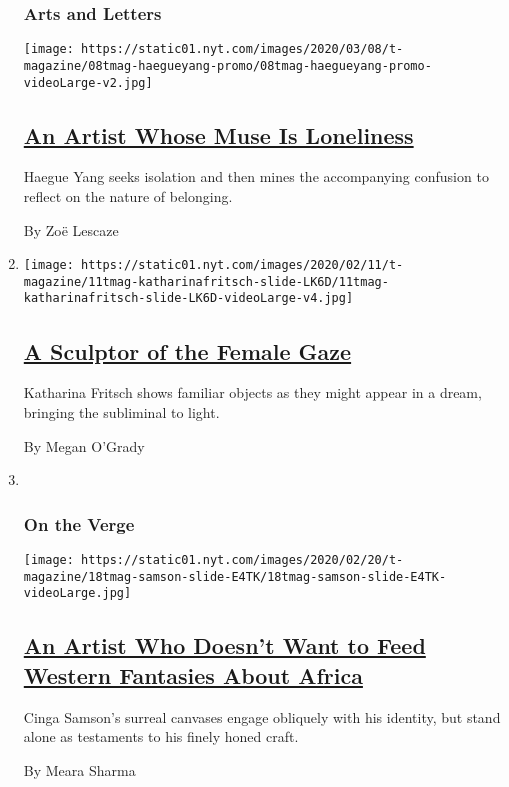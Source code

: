 \begin{enumerate}
{  \subsubsection{Arts and Letters}\label{arts-and-letters}}

  \texttt{[image: https://static01.nyt.com/images/2020/03/08/t-magazine/08tmag-haegueyang-promo/08tmag-haegueyang-promo-videoLarge-v2.jpg]}

  \hypertarget{an-artist-whose-muse-is-loneliness}{%
  \subsection{\texorpdfstring{\href{/2020/02/26/t-magazine/haegue-yang.html}{An
  Artist Whose Muse Is
  Loneliness}}{An Artist Whose Muse Is Loneliness}}\label{an-artist-whose-muse-is-loneliness}}

  Haegue Yang seeks isolation and then mines the accompanying confusion
  to reflect on the nature of belonging.

  By Zoë Lescaze
\item
  \texttt{[image: https://static01.nyt.com/images/2020/02/11/t-magazine/11tmag-katharinafritsch-slide-LK6D/11tmag-katharinafritsch-slide-LK6D-videoLarge-v4.jpg]}

  \hypertarget{a-sculptor-of-the-female-gaze}{%
  \subsection{\texorpdfstring{\href{/2020/02/12/t-magazine/katharina-fritsch-artist.html}{A
  Sculptor of the Female
  Gaze}}{A Sculptor of the Female Gaze}}\label{a-sculptor-of-the-female-gaze}}

  Katharina Fritsch shows familiar objects as they might appear in a
  dream, bringing the subliminal to light.

  By Megan O'Grady
\item ~
  \hypertarget{on-the-verge}{%
  \subsubsection{On the Verge}\label{on-the-verge}}

  \texttt{[image: https://static01.nyt.com/images/2020/02/20/t-magazine/18tmag-samson-slide-E4TK/18tmag-samson-slide-E4TK-videoLarge.jpg]}

  \hypertarget{an-artist-who-doesnt-want-to-feed-western-fantasies-about-africa}{%
  \subsection{\texorpdfstring{\href{/2020/02/21/t-magazine/cinga-samson.html}{An
  Artist Who Doesn't Want to Feed Western Fantasies About
  Africa}}{An Artist Who Doesn't Want to Feed Western Fantasies About Africa}}\label{an-artist-who-doesnt-want-to-feed-western-fantasies-about-africa}}

  Cinga Samson's surreal canvases engage obliquely with his identity,
  but stand alone as testaments to his finely honed craft.

  By Meara Sharma
\end{enumerate}

